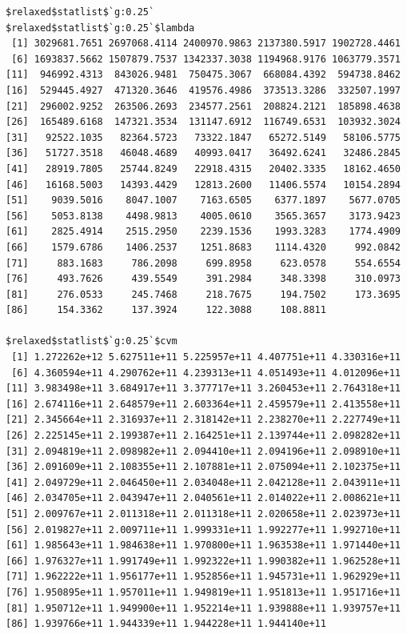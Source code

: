 \documentclass[
]{article}
\begin{document}
\begin{verbatim}
$relaxed$statlist$`g:0.25`
$relaxed$statlist$`g:0.25`$lambda
 [1] 3029681.7651 2697068.4114 2400970.9863 2137380.5917 1902728.4461
 [6] 1693837.5662 1507879.7537 1342337.3038 1194968.9176 1063779.3571
[11]  946992.4313  843026.9481  750475.3067  668084.4392  594738.8462
[16]  529445.4927  471320.3646  419576.4986  373513.3286  332507.1997
[21]  296002.9252  263506.2693  234577.2561  208824.2121  185898.4638
[26]  165489.6168  147321.3534  131147.6912  116749.6531  103932.3024
[31]   92522.1035   82364.5723   73322.1847   65272.5149   58106.5775
[36]   51727.3518   46048.4689   40993.0417   36492.6241   32486.2845
[41]   28919.7805   25744.8249   22918.4315   20402.3335   18162.4650
[46]   16168.5003   14393.4429   12813.2600   11406.5574   10154.2894
[51]    9039.5016    8047.1007    7163.6505    6377.1897    5677.0705
[56]    5053.8138    4498.9813    4005.0610    3565.3657    3173.9423
[61]    2825.4914    2515.2950    2239.1536    1993.3283    1774.4909
[66]    1579.6786    1406.2537    1251.8683    1114.4320     992.0842
[71]     883.1683     786.2098     699.8958     623.0578     554.6554
[76]     493.7626     439.5549     391.2984     348.3398     310.0973
[81]     276.0533     245.7468     218.7675     194.7502     173.3695
[86]     154.3362     137.3924     122.3088     108.8811

$relaxed$statlist$`g:0.25`$cvm
 [1] 1.272262e+12 5.627511e+11 5.225957e+11 4.407751e+11 4.330316e+11
 [6] 4.360594e+11 4.290762e+11 4.239313e+11 4.051493e+11 4.012096e+11
[11] 3.983498e+11 3.684917e+11 3.377717e+11 3.260453e+11 2.764318e+11
[16] 2.674116e+11 2.648579e+11 2.603364e+11 2.459579e+11 2.413558e+11
[21] 2.345664e+11 2.316937e+11 2.318142e+11 2.238270e+11 2.227749e+11
[26] 2.225145e+11 2.199387e+11 2.164251e+11 2.139744e+11 2.098282e+11
[31] 2.094819e+11 2.098982e+11 2.094410e+11 2.094196e+11 2.098910e+11
[36] 2.091609e+11 2.108355e+11 2.107881e+11 2.075094e+11 2.102375e+11
[41] 2.049729e+11 2.046450e+11 2.034048e+11 2.042128e+11 2.043911e+11
[46] 2.034705e+11 2.043947e+11 2.040561e+11 2.014022e+11 2.008621e+11
[51] 2.009767e+11 2.011318e+11 2.011318e+11 2.020658e+11 2.023973e+11
[56] 2.019827e+11 2.009711e+11 1.999331e+11 1.992277e+11 1.992710e+11
[61] 1.985643e+11 1.984638e+11 1.970800e+11 1.963538e+11 1.971440e+11
[66] 1.976327e+11 1.991749e+11 1.992322e+11 1.990382e+11 1.962528e+11
[71] 1.962222e+11 1.956177e+11 1.952856e+11 1.945731e+11 1.962929e+11
[76] 1.950895e+11 1.957011e+11 1.949819e+11 1.951813e+11 1.951716e+11
[81] 1.950712e+11 1.949900e+11 1.952214e+11 1.939888e+11 1.939757e+11
[86] 1.939766e+11 1.944339e+11 1.944228e+11 1.944140e+11


\end{verbatim}
\end{document}
